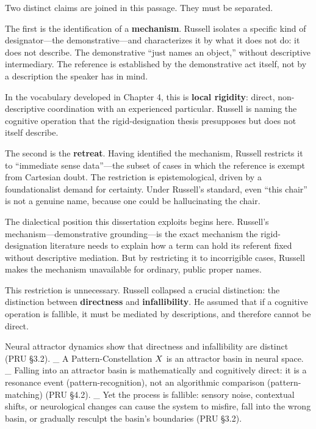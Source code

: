 \documentclass[12pt,a4paper]{article}
\begin{document}
Two distinct claims are joined in this passage. They must be separated.

The first is the identification of a \textbf{mechanism}. Russell isolates a specific kind of designator---the demonstrative---and characterizes it by what it does not do: it does not describe. The demonstrative ``just names an object,'' without descriptive intermediary. The reference is established by the demonstrative act itself, not by a description the speaker has in mind.

In the vocabulary developed in Chapter 4, this is \textbf{local rigidity}: direct, non-descriptive coordination with an experienced particular. Russell is naming the cognitive operation that the rigid-designation thesis presupposes but does not itself describe.

The second is the \textbf{retreat}. Having identified the mechanism, Russell restricts it to ``immediate sense data''---the subset of cases in which the reference is exempt from Cartesian doubt. The restriction is epistemological, driven by a foundationalist demand for certainty. Under Russell's standard, even ``this chair'' is not a genuine name, because one could be hallucinating the chair.

The dialectical position this dissertation exploits begins here. Russell's mechanism---demonstrative grounding---is the exact mechanism the rigid-designation literature needs to explain how a term can hold its referent fixed without descriptive mediation. But by restricting it to incorrigible cases, Russell makes the mechanism unavailable for ordinary, public proper names.

This restriction is unnecessary. Russell collapsed a crucial distinction: the distinction between \textbf{directness} and \textbf{infallibility}. He assumed that if a cognitive operation is fallible, it must be mediated by descriptions, and therefore cannot be direct.

Neural attractor dynamics show that directness and infallibility are distinct (PRU §3.2). \_ A Pattern-Constellation \(\\{X\\}\) is an attractor basin in neural space. \_ Falling into an attractor basin is mathematically and cognitively direct: it is a resonance event (pattern-recognition), not an algorithmic comparison (pattern-matching) (PRU §4.2). \_ Yet the process is fallible: sensory noise, contextual shifts, or neurological changes can cause the system to misfire, fall into the wrong basin, or gradually resculpt the basin's boundaries (PRU §3.2).
\end{document}
